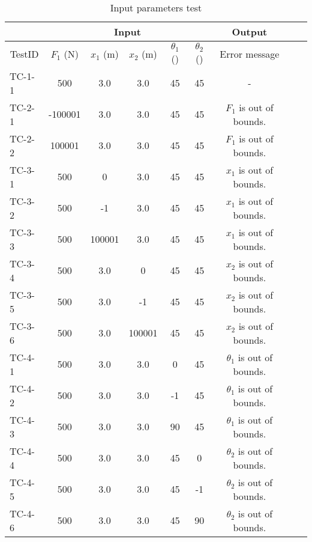 \documentclass[12pt, titlepage]{article}
\begin{document}
\begin{enumerate}
\begin{table}[h]
	\begin{tabular}{l|ccccc|ccc}
		\toprule
		\multicolumn{1}{l}{}   & \multicolumn{5}{c}{Input}  & 
		\multicolumn{1}{c}{Output}\\     
		\midrule \multicolumn{1}{c}{TestID} & $F_1$ (\si{\newton})& $x_1$ 
		(\si{\metre}) & $x_2$ (\si{\metre}) & $\theta_1$ (\textdegree) & 
		\multicolumn{1}{c}{$\theta_2$(\textdegree)} & Error	message \\ 
		\midrule
		TC-1-1 & 500    & 3.0    & 3.0    & 45    & 45    & - \\
		TC-2-1 & -100001& 3.0    & 3.0    & 45    & 45    & $F_1$ is 
		out of bounds. \\
		TC-2-2 & 100001 & 3.0    & 3.0    & 45    & 45    & $F_1$ is 
		out of bounds. \\
		TC-3-1 & 500    & 0 	 & 3.0    & 45    & 45    & $x_1$ is 
		out of bounds. \\
		TC-3-2 & 500    & -1  	 & 3.0    & 45    & 45    & $x_1$ is 
		out of bounds. \\
		TC-3-3 & 500    & 100001 & 3.0	  & 45    & 45    & $x_1$ is 
		out of bounds. \\
		TC-3-4 & 500    & 3.0    & 0  	  & 45    & 45    & $x_2$ is 
		out of bounds. \\
		TC-3-5 & 500    & 3.0    & -1     & 45    & 45    & $x_2$ is 
		out of bounds. \\
		TC-3-6 & 500    & 3.0    & 100001 & 45    & 45    & $x_2$ is 
		out of bounds. \\
		TC-4-1 & 500    & 3.0    & 3.0    & 0     & 45    & $\theta_1$ is 
		out of bounds. \\
		TC-4-2 & 500    & 3.0    & 3.0    & -1    & 45 	  & $\theta_1$ is 
		out of bounds. \\
		TC-4-3 & 500    & 3.0    & 3.0    & 90    & 45    & $\theta_1$ is 
		out of bounds. \\
		TC-4-4 & 500    & 3.0    & 3.0    & 45    & 0     & $\theta_2$ is 
		out of bounds. \\ 
		TC-4-5 & 500    & 3.0    & 3.0    & 45    & -1    & $\theta_2$ is 
		out of bounds. \\
		TC-4-6 & 500    & 3.0    & 3.0    & 45    & 90    & $\theta_2$ is 
		out of bounds. \\ 
		\bottomrule
	\end{tabular}
	\caption{Input parameters test}
	\label{TblInparamtest}
\end{table}


\end{enumerate}
\end{document}
